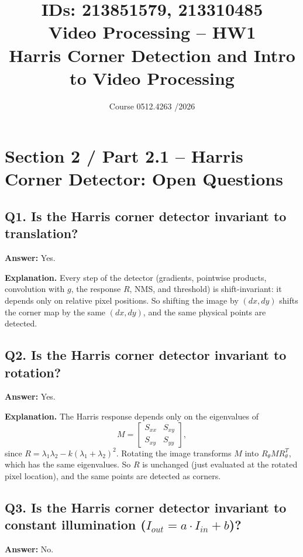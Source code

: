 \documentclass[11pt]{article}
\title{
    \normalsize IDs: 213851579, 213310485 \\[1em] %
    \huge Video Processing -- HW1 \\ 
    \large Harris Corner Detection and Intro to Video Processing
}
\author{}
\date{Course 0512.4263 \quad 2025/2026}
\begin{document}

\maketitle

\section*{Section 2 / Part 2.1 -- Harris Corner Detector: Open Questions}

\subsection*{Q1. Is the Harris corner detector invariant to translation?}
\textbf{Answer:} Yes.

\medskip
\noindent\textbf{Explanation.}
Every step of the detector (gradients, pointwise products, convolution with $g$, the response $R$, NMS, and threshold) is shift-invariant: it depends only on relative pixel positions. So shifting the image by $(dx,dy)$ shifts the corner map by the same $(dx,dy)$, and the same physical points are detected.



\subsection*{Q2. Is the Harris corner detector invariant to rotation?}
\textbf{Answer:} Yes.

\medskip
\noindent\textbf{Explanation.}
The Harris response depends only on the eigenvalues of
\[
    M = \begin{bmatrix} S_{xx} & S_{xy} \\ S_{xy} & S_{yy} \end{bmatrix},
\]
since $R = \lambda_1 \lambda_2 - k(\lambda_1 + \lambda_2)^2$.
Rotating the image transforms $M$ into $R_\theta M R_\theta^{T}$, which has the same eigenvalues. So $R$ is unchanged (just evaluated at the rotated pixel location), and the same points are detected as corners.



\subsection*{Q3. Is the Harris corner detector invariant to constant illumination
($I_{out} = a \cdot I_{in} + b$)?}
\textbf{Answer:} No.
\end{document}
